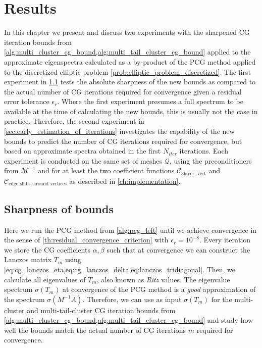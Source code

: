 \chapter{Results}\label{ch:results}
In this chapter we present and discuss two experiments with the sharpened CG iteration bounds from \cref{alg:multi_cluster_cg_bound,alg:multi_tail_cluster_cg_bound} applied to the approximate eigenspectra calculated as a by-product of the PCG method applied to the discretized elliptic problem \cref{prob:elliptic_problem_discretized}. The first experiment in \cref{sec:sharpness_of_bounds} tests the absolute sharpness of the new bounds as compared to the actual number of CG iterations required for convergence given a residual error tolerance $\epsilon_r$. Where the first experiment presumes a full spectrum to be available at the time of calculating the new bounds, this is usually not the case in practice. Therefore, the second experiment in \cref{sec:early_estimation_of_iterations} investigates the capability of the new bounds to predict the number of CG iterations required for convergence, but based on approximate spectra obtained in the first $N_{iter}$ iterations. Each experiment is conducted on the same set of meshes $\mathcal{Q}$, using the preconditioners from $\mathcal{M}^{-1}$ and for at least the two coefficient functions $\mathcal{C}_{\text{3layer, vert}}$ and $\mathcal{C}_{\text{edge slabs, around vertices}}$ as described in \cref{ch:implementation}. 

\section{Sharpness of bounds}\label{sec:sharpness_of_bounds}
Here we run the PCG method from \cref{alg:pcg_left} until we achieve convergence in the sense of \cref{th:residual_convergence_criterion} with $\epsilon_r=10^{-8}$. Every iteration we store the CG coefficients $\alpha,\beta$ such that at convergence we can construct the Lanczos matrix $T_m$ using \cref{eq:cg_lanczos_eta,eq:cg_lanczos_delta,eq:lanczos_tridiagonal}. Then, we calculate all eigenvalues of $T_m$, also known as \textit{Ritz} values. The eigenvalue spectrum $\sigma(T_m)$ at convergence of the PCG method is a \textit{good} approximation of the spectrum $\sigma(M^{-1}A)$. Therefore, we can use as input $\sigma(T_m)$ for the multi-cluster and multi-tail-cluster CG iteration bounds from \cref{alg:multi_cluster_cg_bound,alg:multi_tail_cluster_cg_bound} and study how well the bounds match the actual number of CG iterations $m$ required for convergence. 

